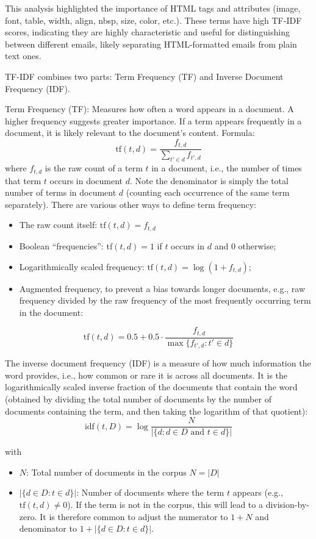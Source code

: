This analysis highlighted the importance of HTML tags and attributes (image, font, table, width, align, nbsp, size, color, etc.). These terms have high TF-IDF scores, indicating they are highly characteristic and useful for distinguishing between different emails, likely separating HTML-formatted emails from plain text ones.

TF-IDF combines two parts: Term Frequency (TF) and Inverse Document Frequency (IDF).

Term Frequency (TF): Measures how often a word appears in a document.
A higher frequency suggests greater importance.
If a term appears frequently in a document, it is likely relevant to the document’s content.
Formula:
\[
    \text{tf}(t, d) = \frac{f_{t,d}}{\sum_{t' \in d} f_{t',d}}
\]
where $f_{t,d}$ is the raw count of a term $t$ in a document, i.e., the number of times that term $t$ occurs in document $d$.
Note the denominator is simply the total number of terms in document $d$ (counting each occurrence of the same term separately).
There are various other ways to define term frequency:
\begin{itemize}
    \item The raw count itself: $\text{tf}(t,d) = f_{t,d}$
    \item Boolean ``frequencies'': $\text{tf}(t,d) = 1$ if $t$ occurs in $d$ and 0 otherwise;
    \item Logarithmically scaled frequency: $\text{tf}(t,d) = \log (1 + f_{t,d})$;
    \item Augmented frequency, to prevent a bias towards longer documents, e.g., raw frequency divided by the raw frequency of the most frequently occurring term in the document:
\end{itemize}
\[
    \text{tf}(t, d) = 0.5 + 0.5 \cdot \frac{f_{t,d}}{\max\{f_{t',d} : t' \in d\}}
\]

The inverse document frequency (IDF) is a measure of how much information the word provides, i.e., how common or rare it is across all documents.
It is the logarithmically scaled inverse fraction of the documents that contain the word (obtained by dividing the total number of documents by the number of documents containing the term, and then taking the logarithm of that quotient):
\[
    \text{idf}(t, D) = \log \frac{N}{|\{d : d \in D \text{ and } t \in d\}|}
\]

with
\begin{itemize}[leftmargin=2em, itemsep=0.5ex] %
    \item $N$: Total number of documents in the corpus $N = |D|$
    \item $|\{d \in D : t \in d\}|$: Number of documents where the term $t$ appears (e.g., $\text{tf}(t,d) \neq 0$). If the term is not in the corpus, this will lead to a division-by-zero.
    It is therefore common to adjust the numerator to $1+N$ and denominator to $1 + |\{d \in D : t \in d\}|$.
\end{itemize}

